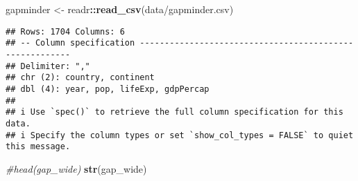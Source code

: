 \documentclass[
]{article}
\newenvironment{Shaded}{\begin{snugshade}}{\end{snugshade}}
\newcommand{\CommentTok}[1]{\textcolor[rgb]{0.56,0.35,0.01}{\textit{#1}}}
\newcommand{\FunctionTok}[1]{\textcolor[rgb]{0.13,0.29,0.53}{\textbf{#1}}}
\newcommand{\NormalTok}[1]{#1}
\newcommand{\OtherTok}[1]{\textcolor[rgb]{0.56,0.35,0.01}{#1}}
\newcommand{\SpecialCharTok}[1]{\textcolor[rgb]{0.81,0.36,0.00}{\textbf{#1}}}
\newcommand{\StringTok}[1]{\textcolor[rgb]{0.31,0.60,0.02}{#1}}
\begin{document}
\begin{Shaded}
\begin{Highlighting}[]
\NormalTok{gapminder }\OtherTok{\textless{}{-}}\NormalTok{ readr}\SpecialCharTok{::}\FunctionTok{read\_csv}\NormalTok{(}\StringTok{\textquotesingle{}data/gapminder.csv\textquotesingle{}}\NormalTok{)}
\end{Highlighting}
\end{Shaded}

\begin{verbatim}
## Rows: 1704 Columns: 6
## -- Column specification --------------------------------------------------------
## Delimiter: ","
## chr (2): country, continent
## dbl (4): year, pop, lifeExp, gdpPercap
## 
## i Use `spec()` to retrieve the full column specification for this data.
## i Specify the column types or set `show_col_types = FALSE` to quiet this message.
\end{verbatim}

\begin{Shaded}
\begin{Highlighting}[]
\CommentTok{\#head(gap\_wide)}
\FunctionTok{str}\NormalTok{(gap\_wide)}
\end{Highlighting}
\end{Shaded}
\end{document}
